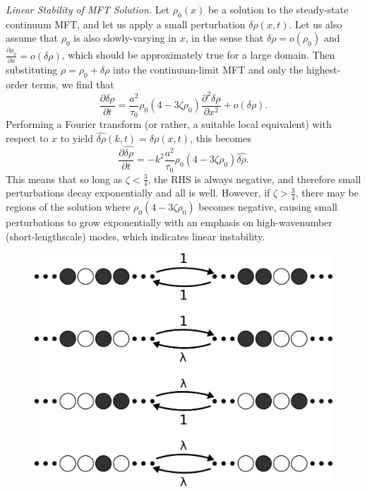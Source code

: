 \documentclass[
reprint,
 amsmath,amssymb,
 aps,
 prl,
]{revtex4-1}
\newcommand{\partDeriv}[2]{\frac{\partial #1}{\partial #2}}
\begin{document}
\textit{Linear Stability of MFT Solution.} Let $\rho_0 (x)$ be a solution to the steady-state continuum MFT, and let us apply a small perturbation $\delta \rho(x, t)$. Let us also assume that $\rho_0$ is also slowly-varying in $x$,
in the sense that $\delta \rho = o(\rho_0)$ and $ \partDeriv{\rho_0}{x} = o(\delta \rho)$, which should be approximately true for a large domain.
Then substituting $\rho = \rho_0 + \delta \rho$ into the continuum-limit MFT and only the highest-order terms, we find that
\begin{equation}
 \partDeriv{\delta \rho}{t} =  \frac{a^2}{\tau_0} \rho_0 (4 - 3 \zeta \rho_0) \partDeriv{^2 \delta \rho}{x^2} + o(\delta \rho).
\end{equation}
Performing a  Fourier transform  (or rather, a suitable local equivalent) with respect to $x$ to yield $\hat{\delta \rho}(k, t) = \delta \rho(x, t)$, this becomes
\begin{equation}
 \partDeriv{\hat{\delta \rho}}{t} = -k^2 \frac{a^2}{\tau_0}\rho_0 (4 - 3 \zeta \rho_0)\hat{\delta \rho}.
\end{equation}
This means that so long as $\zeta < \frac{3}{4}$, the RHS is always negative, and therefore small perturbations decay exponentially and all is well. However, if $\zeta>\frac{3}{4}$, there may be regions of the solution where
$\rho_0 (4 - 3 \zeta \rho_0)$ becomes negative, causing small perturbations to grow exponentially with an emphasis on high-wavenumber (short-lengthscale) modes, which indicates linear instability.


\begin{figure}[h!]
\vspace{0em}
\caption{\label{fig:detailedBalance}
\vspace{1em}}
\includegraphics[width=0.98\linewidth]{images/detailedBalanceDiagram-crop}
    \vspace{-0em}
\end{figure}
\end{document}
